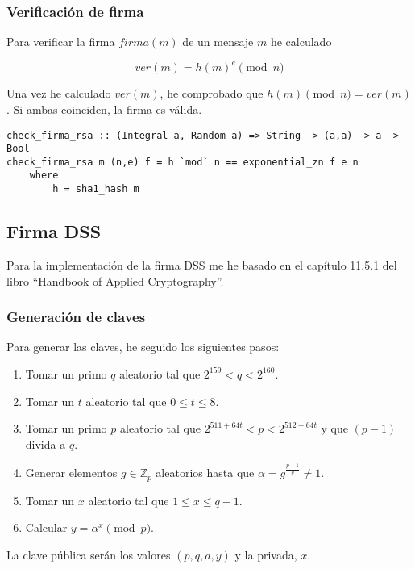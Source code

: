 \documentclass[10pt,spanish]{article}
\begin{document}
\subsubsection{\textcolor{azul}Verificación de firma}
Para verificar la firma $firma(m)$ de un mensaje $m$ he calculado

\begin{displaymath}
    ver(m) = h(m)^e \pmod n
\end{displaymath}

Una vez he calculado $ver(m)$, he comprobado que $h(m) \pmod n = ver(m)$. Si ambas coinciden, la firma es válida.

\begin{verbatim}
check_firma_rsa :: (Integral a, Random a) => String -> (a,a) -> a -> Bool
check_firma_rsa m (n,e) f = h `mod` n == exponential_zn f e n
    where
        h = sha1_hash m
\end{verbatim}

\subsection{\textcolor{azul}Firma DSS}
Para la implementación de la firma DSS me he basado en el capítulo 11.5.1 del libro ``Handbook of Applied Cryptography''.

\subsubsection{\textcolor{azul}Generación de claves}
Para generar las claves, he seguido los siguientes pasos:

\begin{enumerate}
    \item Tomar un primo $q$ aleatorio tal que $2^{159} < q < 2^{160}$.
    \item Tomar un $t$ aleatorio tal que $0 \leq t \leq 8$.
    \item Tomar un primo $p$ aleatorio tal que $2^{511+64t} < p < 2^{512+64t}$ y que $(p-1)$ divida a $q$.
    \item Generar elementos $g \in \mathbb{Z}_p$ aleatorios hasta que $\alpha = g^{\frac{p-1}{q}} \neq 1$.
    \item Tomar un $x$ aleatorio tal que $1 \leq x \leq q-1$.
    \item Calcular $y = \alpha^x \pmod p$. 
\end{enumerate}

La clave pública serán los valores $(p,q,a,y)$ y la privada, $x$.
\end{document}
